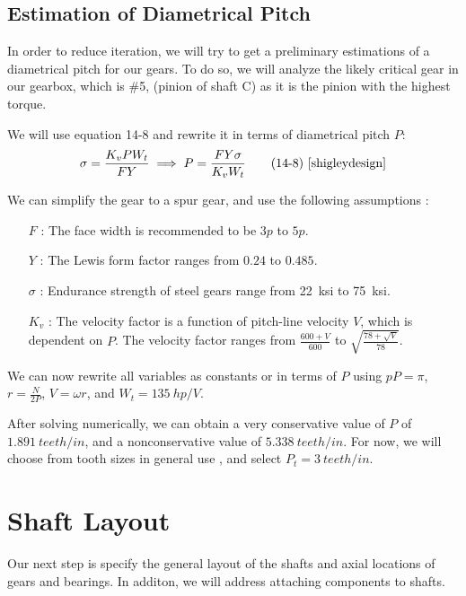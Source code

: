 \documentclass[titlepage]{article} %
\begin{document}
\subsection{Estimation of Diametrical Pitch}

In order to reduce iteration, we will try to get a preliminary estimations of a
diametrical pitch for our gears. To do so, we will analyze the likely critical
gear in our gearbox, which is \#5, (pinion of shaft C) as it is the pinion
with the highest torque.

We will use equation 14-8 and rewrite it in terms of diametrical pitch $P$:
\begin{equation}
\sigma = \frac{K_{v} P W_{t}}{F Y} \implies P = \frac{F Y \sigma}{K_{v} W_{t}} \tag*{(14-8) \cite{shigleydesign}}
\end{equation}


\noindent We can simplify the gear to a spur gear, and use the following assumptions  \cite{shigleydesign}:

\begin{itemize}[label=]
    \item[$F$]: The face width is recommended to be $3p$ to $5p$.
    \item[$Y$]: The Lewis form factor ranges from $0.24$ to $0.485$.
    \item[$\sigma$]: Endurance strength of steel gears range from \SI{22}{ksi} to
    \SI{75}{ksi}.
    \item[$K_v$]: The velocity factor is a function of pitch-line velocity $V$,
    which is dependent on $P$. The velocity factor ranges from $\frac{600 +
    V}{600}$ to $\sqrt{\frac{78 + \sqrt{V}}{78}}$.
\end{itemize}

We can now rewrite all variables as constants or in terms of $P$ using $pP=\pi$,
$r=\frac{N}{2P}$, $V=\omega r$, and $W_t = \SI{135}{hp}/V$. 

After solving numerically, we can obtain a very conservative value of $P$ of
$\SI{1.891}{teeth/in}$, and a nonconservative value of $\SI{5.338}{teeth/in}$.
For now, we will choose from tooth sizes in general use \cite{shigleydesign},
and select $P_t=\SI{3}{teeth/in}$.


\section{Shaft Layout}
Our next step is specify  the general layout of the shafts and axial locations
of gears and bearings. In additon, we will address attaching components to
shafts.
\end{document}
